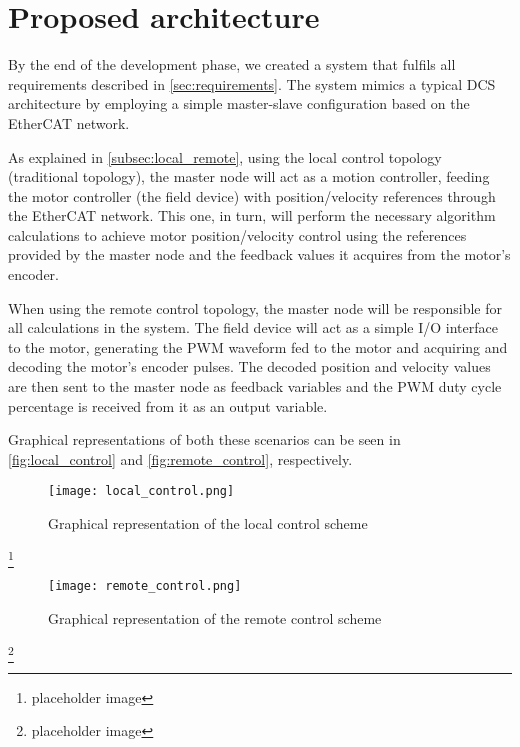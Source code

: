 \section{Proposed architecture} \label{sec:proposed-arch}

By the end of the development phase, we created a system that fulfils all requirements described in \autoref{sec:requirements}.
The system mimics a typical DCS architecture by employing a simple master-slave configuration based on the EtherCAT network.

As explained in \autoref{subsec:local_remote}, using the local control topology (traditional topology), the master node will act as a motion controller, feeding the motor controller (the field device) with position/velocity references through the EtherCAT network.
This one, in turn, will perform the necessary algorithm calculations to achieve motor position/velocity control using the references provided by the master node and the feedback values it acquires from the motor's encoder.

When using the remote control topology, the master node will be responsible for all calculations in the system.
The field device will act as a simple I/O interface to the motor, generating the PWM waveform fed to the motor and acquiring and decoding the motor's encoder pulses.
The decoded position and velocity values are then sent to the master node as feedback variables and the PWM duty cycle percentage is received from it as an output variable.

Graphical representations of both these scenarios can be seen in \autoref{fig:local_control} and \autoref{fig:remote_control}, respectively.


\begin{figure}[htp]
	\centering
	\texttt{[image: local\_control.png]}
	\caption{Graphical representation of the local control scheme}
	\label{fig:local_control}
\end{figure}\footnote{placeholder image}

\begin{figure}[htp]
	\centering
	\texttt{[image: remote\_control.png]}
	\caption{Graphical representation of the remote control scheme}
	\label{fig:remote_control}
\end{figure}\footnote{placeholder image}





